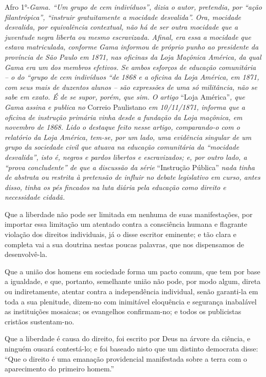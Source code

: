 \begin{didascalia}
Afro 1°-\emph{Gama. ``Um grupo de cem indivíduos'', dizia o autor,
pretendia, por ``ação filantrópica'', ``instruir gratuitamente a mocidade
desvalida''. Ora, mocidade desvalida, por equivalência contextual, não há
de ser outra mocidade que a juventude negra liberta ou mesmo
escravizada. Afinal, era essa a mocidade que estava matriculada,
conforme Gama informou de próprio punho ao presidente da província de
São Paulo em 1871, nas oficinas da Loja Maçônica América, da qual Gama
era um dos membros efetivos. Se ambos esforços de educação comunitária
-- o do ``grupo de cem indivíduos ``de 1868 e a oficina da Loja América,
em 1871, com seus mais de duzentos alunos -- são expressões de uma só
militância, não se sabe em exato. É de se supor, porém, que sim. O
artigo} ``Loja América''\emph{, que Gama assina e publica no} Correio
Paulistano \emph{em 10/11/1871, informa que a oficina de instrução
primária vinha desde a fundação da Loja maçônica, em novembro de 1868.
Lido o destaque feito nesse artigo, comparando-o com o relatório da Loja
América, tem-se, por um lado, uma evidência singular de um grupo da
sociedade civil que atuava na educação comunitária da ``mocidade
desvalida'', isto é, negros e pardos libertos e escravizados; e, por
outro lado, a ``prova concludente'' de que a discussão da série}
``Instrução Pública'' \emph{nada tinha de abstrata ou restrita à pretensão
de influir no debate legislativo em curso, antes disso, tinha os pés
fincados na luta diária pela educação como direito e necessidade
cidadã.}
\end{didascalia}



Que a liberdade não pode ser limitada em nenhuma de suas manifestações,
por importar essa limitação um atentado contra a consciência humana e
flagrante violação dos direitos individuais, já o disse escritor
eminente; e tão clara e completa vai a sua doutrina nestas poucas
palavras, que nos dispensamos de desenvolvê-la.

Que a união dos homens em sociedade forma um pacto comum, que tem por
base a igualdade, e que, portanto, semelhante união não pode, por modo
algum, direta ou indiretamente, atentar contra a independência
individual, senão garanti-la em toda a sua plenitude, dizem-no com
inimitável eloquência e segurança inabalável as instituições mosaicas;
os evangelhos confirmam-no; e todos os publicistas cristãos
sustentam-no.

Que a liberdade é causa do direito, foi escrito por Deus na árvore da
ciência, e ninguém ousará contestá-lo; e foi baseado nisto que um
distinto democrata disse: ``Que o direito é uma emanação providencial
manifestada sobre a terra com o aparecimento do primeiro homem.''

